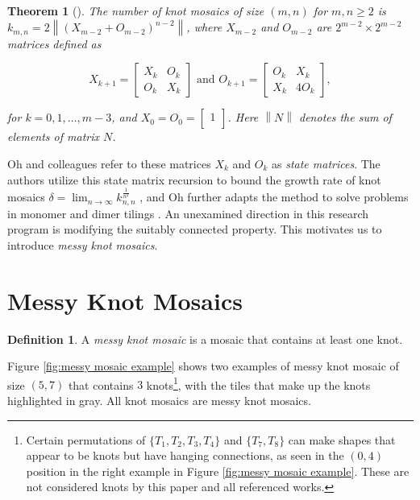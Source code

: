 \documentclass[12pt]{article}
\theoremstyle{plain}
\newtheorem{thm}{Theorem}[section]
\theoremstyle{definition}
\newtheorem{definition}{Definition}[section]
\theoremstyle{remark}
\theoremstyle{definition}
\begin{document}
\begin{thm}[\cite{Oh2014}]
    \label{thm:Oh2014}
    The number of knot mosaics of size $(m,n)$ for $m,n \geq 2$ is $k_{m,n} = 2 \left\| (X_{m-2}+O_{m-2})^{n-2} \right\|$, where $X_{m-2}$ and $O_{m-2}$ are $2^{m-2} \times 2^{m-2}$ matrices defined as

    $$ X_{k+1} = \begin{bmatrix}
        X_k & O_k \\
        O_k & X_k
    \end{bmatrix}
    \text{ and }
    O_{k+1} = \begin{bmatrix}
        O_k & X_k \\
        X_k & 4O_k
    \end{bmatrix}, $$
    
    for $k=0,1,\dots,m-3$, and $X_0 = O_0 = \begin{bmatrix} 1 \\ \end{bmatrix}$. Here $\left\| N \right\|$ denotes the sum of elements of matrix $N$.
\end{thm}

Oh and colleagues refer to these matrices $X_k$ and $O_k$ as \textit{state matrices}. The authors utilize this state matrix recursion to bound the growth rate of knot mosaics $\delta = \lim_{n \to \infty} k_{n,n}^{\frac{1}{n^2}}$ \cite{Oh2016, Oh2019, Choi2024}, and Oh further adapts the method to solve problems in monomer and dimer tilings \cite{Oh2018Aztec, Oh2019tiling}. An unexamined direction in this research program is modifying the suitably connected property. This motivates us to introduce \textit{messy knot mosaics}.


\section{Messy Knot Mosaics}\label{section:messy mosaics}

\begin{definition}
    A \textit{messy knot mosaic} is a mosaic that contains at least one knot. 
\end{definition}

Figure \ref{fig:messy mosaic example} shows two examples of messy knot mosaic of size $(5,7)$ that contains $3$ knots\footnote{Certain permutations of $\{T_1, T_2, T_3, T_4\}$ and $\{T_7,T_8\}$ can make shapes that appear to be knots but have hanging connections, as seen in the $(0,4)$ position in the right example in Figure \ref{fig:messy mosaic example}. These are not considered knots by this paper and all referenced works.}, with the tiles that make up the knots highlighted in gray. All knot mosaics are messy knot mosaics.
\end{document}
